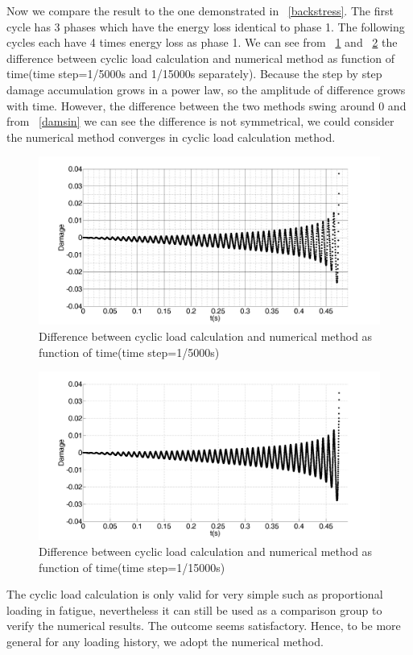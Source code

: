 \documentclass[3p,times,number,review]{elsarticle}
\newcommand{\figref}[1]{\figurename~\ref{#1}}
\begin{document}
Now we compare the result to the one demonstrated in \figref{backstress}. The first cycle has 3 phases which have the energy loss identical to phase 1. The following cycles each have 4 times energy loss as phase 1. We can see from \figref{NCdiff100} and \figref{NCdiff300} the difference between cyclic load calculation and numerical method as function of time(time step=1/5000s and 1/15000s separately). Because the step by step damage accumulation grows in a power law, so the amplitude of difference grows with time. However, the difference between the two methods swing around 0 and from \figref{damsin} we can see the difference is not symmetrical, we could consider the numerical method converges in cyclic load calculation method.

\begin{figure}[!h]
	\centering
	\includegraphics[width=\textwidth]{figures//NCdiff100.png} 
	\caption{Difference between cyclic load calculation and numerical method as function of time(time step=1/5000s)}
	\label{NCdiff100}
\end{figure}
\begin{figure}[!h]
	\centering
	\includegraphics[width=\textwidth]{figures//NCdiff300.png} 
	\caption{Difference between cyclic load calculation and numerical method as function of time(time step=1/15000s)}
	\label{NCdiff300}
\end{figure}
The cyclic load calculation is only valid for very simple such as proportional loading in fatigue, nevertheless it can still be used as a comparison group to verify the numerical results. The outcome seems satisfactory. Hence, to be more general for any loading history, we adopt the numerical method.
\end{document}
